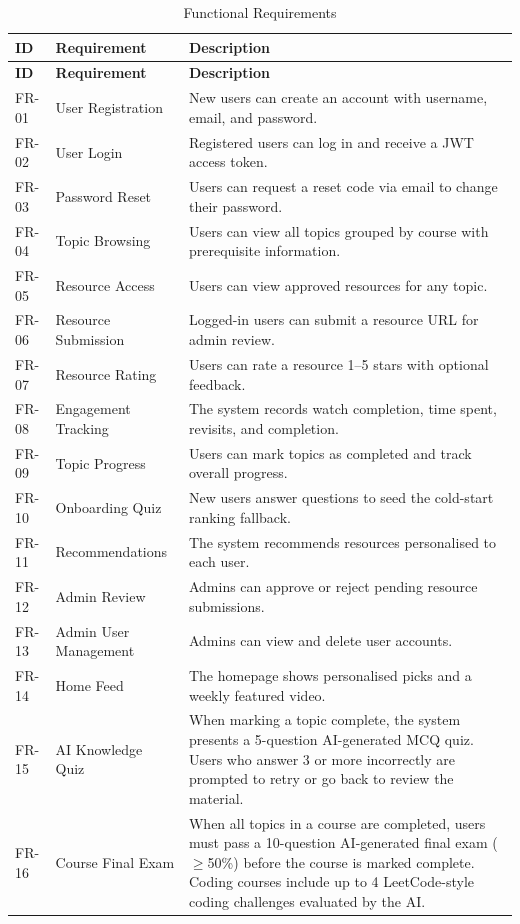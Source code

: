 \documentclass[12pt,a4paper]{report}
\begin{document}
\begin{longtable}{p{} p{} p{}}
\caption{Functional Requirements}\label{tab:func-req}\\
\toprule
\textbf{ID} & \textbf{Requirement} & \textbf{Description} \\
\midrule
\endfirsthead
\toprule
\textbf{ID} & \textbf{Requirement} & \textbf{Description} \\
\midrule
\endhead
FR-01 & User Registration & New users can create an account with username, email, and password. \\
FR-02 & User Login & Registered users can log in and receive a JWT access token. \\
FR-03 & Password Reset & Users can request a reset code via email to change their password. \\
FR-04 & Topic Browsing & Users can view all topics grouped by course with prerequisite information. \\
FR-05 & Resource Access & Users can view approved resources for any topic. \\
FR-06 & Resource Submission & Logged-in users can submit a resource URL for admin review. \\
FR-07 & Resource Rating & Users can rate a resource 1--5 stars with optional feedback. \\
FR-08 & Engagement Tracking & The system records watch completion, time spent, revisits, and completion. \\
FR-09 & Topic Progress & Users can mark topics as completed and track overall progress. \\
FR-10 & Onboarding Quiz & New users answer questions to seed the cold-start ranking fallback. \\
FR-11 & Recommendations & The system recommends resources personalised to each user. \\
FR-12 & Admin Review & Admins can approve or reject pending resource submissions. \\
FR-13 & Admin User Management & Admins can view and delete user accounts. \\
FR-14 & Home Feed & The homepage shows personalised picks and a weekly featured video. \\
FR-15 & AI Knowledge Quiz & When marking a topic complete, the system presents a 5-question AI-generated MCQ quiz. Users who answer 3 or more incorrectly are prompted to retry or go back to review the material. \\
FR-16 & Course Final Exam & When all topics in a course are completed, users must pass a 10-question AI-generated final exam ($\geq$50\%) before the course is marked complete. Coding courses include up to 4 LeetCode-style coding challenges evaluated by the AI. \\
\bottomrule
\end{longtable}
\end{document}
